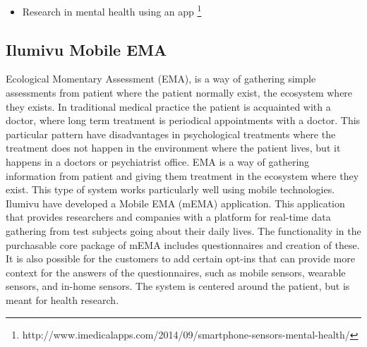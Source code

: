 \begin{itemize}
    \item Research in mental health using an app \footnote{http://www.imedicalapps.com/2014/09/smartphone-sensors-mental-health/}
\end{itemize}

\subsection{Ilumivu Mobile EMA}
\label{sub:ilumivu_mobile_ema}

Ecological Momentary Assessment (EMA), is a way of gathering simple assessments from patient where the patient normally exist, the ecosystem where they exists. In traditional medical practice the patient is acquainted with a doctor, where long term treatment is periodical appointments with a doctor. This particular pattern have disadvantages in psychological treatments where the treatment does not happen in the environment where the patient lives, but it happens in a doctors or psychiatrist office. EMA is a way of gathering information from patient and giving them treatment in the ecosystem where they exist. This type of system works particularly well using mobile technologies. Ilumivu have developed a Mobile EMA (mEMA) application. This application that provides researchers and companies with a platform for real-time data gathering from test subjects going about their daily lives. The functionality in the purchasable core package of mEMA includes questionnaires and creation of these. It is also possible for the customers to add certain opt-ins that can provide more context for the answers of the questionnaires, such as mobile sensors, wearable sensors, and in-home sensors. The system is centered around the patient, but is meant for health research.





